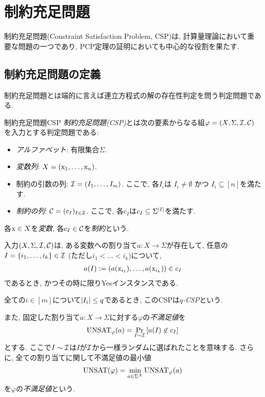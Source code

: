 \chapter{制約充足問題} \label{chap:CSP}
制約充足問題(Constraint Satisfaction Problem, CSP)は, 計算量理論において重要な問題の一つであり, PCP定理の証明においても中心的な役割を果たす.

\section{制約充足問題の定義}
制約充足問題とは端的に言えば連立方程式の解の存在性判定を問う判定問題である.

\begin{definition}{制約充足問題}{CSP}
\emph{制約充足問題(CSP)}とは次の要素からなる組$\varphi = (X,\Sigma,\mathcal{I},\mathcal{C})$を入力とする判定問題である:
\begin{itemize}
  \item \emph{アルファベット}: 有限集合$\Sigma$.
  \item \emph{変数列}: $X=(\mathrm{x}_1,\dots,\mathrm{x}_n)$.
  \item 制約の引数の列: $\mathcal{I}=(I_1,\dots,I_m)$. ここで, 各$I_i$は $I_i\ne\emptyset$ かつ $I_i\subseteq [n]$を満たす.
  \item \emph{制約の列}: $\mathcal{C}=(c_I)_{I\in\mathcal{I}}$. ここで, 各$c_I$は$c_I \subseteq \Sigma^{\abs{I}}$を満たす.
\end{itemize}
各$\mathrm{x}\in X$を\emph{変数}, 各$c_I\in\mathcal{C}$を\emph{制約}という.

入力$(X,\Sigma,\mathcal{I},\mathcal{C})$は,
ある変数への割り当て$a \colon X \to \Sigma$が存在して, 任意の$I=\{i_1,\dots,i_k\}\in\mathcal{I}$ (ただし$i_1<\dots<i_k$)について,
\begin{align*}
  a(I) := (a(\mathrm{x}_{i_1}),\dots,a(\mathrm{x}_{i_k})) \in c_I
\end{align*}
であるとき, かつその時に限りYesインスタンスである.

全ての$i\in[m]$について$\abs{I_i}\le q$であるとき, このCSPは\emph{$q$-CSP}という.

また, 固定した割り当て$a \colon X\to \Sigma$に対する$\varphi$の\emph{不満足値}を
\begin{align*}
  \mathrm{UNSAT}_\varphi(a) = \Pr_{I\sim\mathcal{I}}\qty[a(I) \not\in c_I]
\end{align*}
とする. ここで$I\sim\mathcal{I}$は$I$が$\mathcal{I}$から一様ランダムに選ばれたことを意味する.
さらに, 全ての割り当てに関して不満足値の最小値
\begin{align*}
  \mathrm{UNSAT}(\varphi) = \min_{a\in\Sigma^X} \mathrm{UNSAT}_\varphi(a)
\end{align*}
を$\varphi$の\emph{不満足値}という.
\end{definition}

